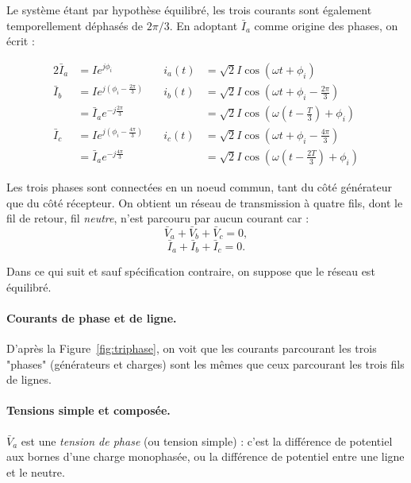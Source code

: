 Le système étant par hypothèse équilibré, les trois courants sont également temporellement déphasés de $2\pi/3$. En adoptant $\bar{I}_a$ comme origine des phases, on écrit :
\begin{marginfigure}
	\centering
	
	\caption{Phaseurs de courant des trois phases. \label{fig:3P_courants}}
\end{marginfigure}

\begin{alignat*}{2}
	\bar{I}_a& =  Ie^{j\phi_i} & \quad i_a(t) & =\sqrt{2}I\cos(\omega t+\phi_i)\\
	\bar{I}_b& =  Ie^{j(\phi_i-\frac{2\pi}{3})} &  \quad i_b(t) &
	=\sqrt{2}I\cos(\omega t+\phi_i-\frac{2\pi}{3})\\
	& = \bar{I}_ae^{-j\frac{2\pi}{3}} & & = \sqrt{2}I\cos(\omega (t-\frac{T}{3})+\phi_i)\\
	\bar{I}_c& =  Ie^{j(\phi_i-\frac{4\pi}{3})} & \quad i_c(t) & 
	=\sqrt{2}I\cos(\omega t+\phi_i-\frac{4\pi}{3}) \\
	& = \bar{I}_ae^{-j\frac{4\pi}{3}}& & = \sqrt{2}I\cos(\omega (t-\frac{2T}{3})+\phi_i)
\end{alignat*}

Les trois phases sont connectées en un noeud commun, tant du côté générateur que du côté récepteur. On obtient un réseau de transmission à quatre fils, dont le fil de retour, fil \textit{neutre}, n'est parcouru par aucun courant car : 
\[\bar{V}_a+\bar{V}_b+\bar{V}_c=0,\]
\[\bar{I}_a+\bar{I}_b+\bar{I}_c=0.\]


Dans ce qui suit et sauf spécification contraire, on suppose que le réseau est équilibré.

\paragraph{Courants de phase et de ligne.}
D'après la Figure~\ref{fig:triphase}, on voit que les courants parcourant les trois "phases" (générateurs et charges) sont les mêmes que ceux parcourant les trois fils de lignes.

\paragraph{Tensions simple et composée.}
$\bar{V}_a$ est une {\em tension de phase} (ou tension simple) : c'est
la différence de potentiel aux bornes d'une charge monophasée, ou la
différence de potentiel entre une ligne et le neutre.

